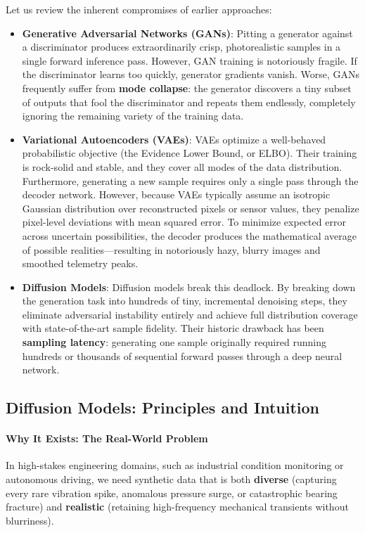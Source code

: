 Let us review the inherent compromises of earlier approaches:
\begin{itemize}
    \item \textbf{Generative Adversarial Networks (GANs)}: Pitting a generator against a discriminator produces extraordinarily crisp, photorealistic samples in a single forward inference pass. However, GAN training is notoriously fragile. If the discriminator learns too quickly, generator gradients vanish. Worse, GANs frequently suffer from \textbf{mode collapse}: the generator discovers a tiny subset of outputs that fool the discriminator and repeats them endlessly, completely ignoring the remaining variety of the training data.
    \item \textbf{Variational Autoencoders (VAEs)}: VAEs optimize a well-behaved probabilistic objective (the Evidence Lower Bound, or ELBO). Their training is rock-solid and stable, and they cover all modes of the data distribution. Furthermore, generating a new sample requires only a single pass through the decoder network. However, because VAEs typically assume an isotropic Gaussian distribution over reconstructed pixels or sensor values, they penalize pixel-level deviations with mean squared error. To minimize expected error across uncertain possibilities, the decoder produces the mathematical average of possible realities---resulting in notoriously hazy, blurry images and smoothed telemetry peaks.
    \item \textbf{Diffusion Models}: Diffusion models break this deadlock. By breaking down the generation task into hundreds of tiny, incremental denoising steps, they eliminate adversarial instability entirely and achieve full distribution coverage with state-of-the-art sample fidelity. Their historic drawback has been \textbf{sampling latency}: generating one sample originally required running hundreds or thousands of sequential forward passes through a deep neural network.
\end{itemize}

\subsection{Diffusion Models: Principles and Intuition}\label{subsec:diffusion_principles}

\paragraph{Why It Exists: The Real-World Problem}
In high-stakes engineering domains, such as industrial condition monitoring or autonomous driving, we need synthetic data that is both \textbf{diverse} (capturing every rare vibration spike, anomalous pressure surge, or catastrophic bearing fracture) and \textbf{realistic} (retaining high-frequency mechanical transients without blurriness). 

